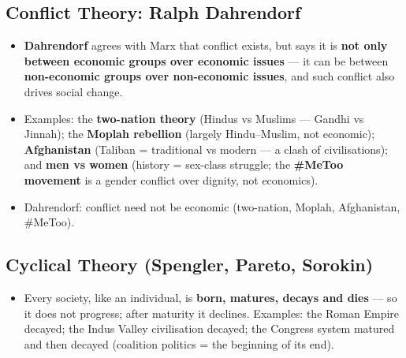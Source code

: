 \sectiondivider

\subsection{Conflict Theory: Ralph Dahrendorf}

\begin{KeyConcept}
\begin{itemize}
    \item \textbf{Dahrendorf} agrees with Marx that conflict exists, but says it is \textbf{not only between economic groups over economic issues} --- it can be between \textbf{non-economic groups over non-economic issues}, and such conflict also drives social change.
    \item Examples: the \textbf{two-nation theory} (Hindus vs Muslims --- Gandhi vs Jinnah); the \textbf{Moplah rebellion} (largely Hindu--Muslim, not economic); \textbf{Afghanistan} (Taliban = traditional vs modern --- a clash of civilisations); and \textbf{men vs women} (history = sex-class struggle; the \textbf{\#MeToo movement} is a gender conflict over dignity, not economics).
\end{itemize}
\end{KeyConcept}

\begin{QuickRevision}
\begin{itemize}
    \item Dahrendorf: conflict need not be economic (two-nation, Moplah, Afghanistan, \#MeToo).
\end{itemize}
\end{QuickRevision}

\sectiondivider

\subsection{Cyclical Theory (Spengler, Pareto, Sorokin)}

\begin{KeyConcept}
\begin{itemize}
    \item Every society, like an individual, is \textbf{born, matures, decays and dies} --- so it does not progress; after maturity it declines. Examples: the Roman Empire decayed; the Indus Valley civilisation decayed; the Congress system matured and then decayed (coalition politics = the beginning of its end).
\end{itemize}
\end{KeyConcept}


